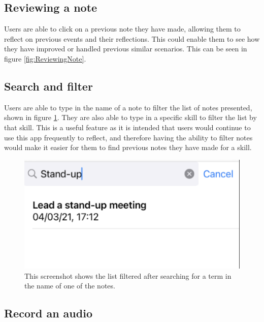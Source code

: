 \documentclass{l4proj}
\begin{document}
\subsection{Reviewing a note}

Users are able to click on a previous note they have made, allowing them to reflect on previous events and their reflections. This could enable them to see how they have improved or handled previous similar scenarios. This can be seen in figure \ref{fig:ReviewingNote}.

\subsection{Search and filter}

Users are able to type in the name of a note to filter the list of notes presented, shown in figure \ref{fig:SearchFilter}. They are also able to type in a specific skill to filter the list by that skill. This is a useful feature as it is intended that users would continue to use this app frequently to reflect, and therefore having the ability to filter notes would make it easier for them to find previous notes they have made for a skill. 

\begin{figure}
    \centering
    \includegraphics[scale=0.4]{images/SearchFilter.pdf}    
    \caption{This screenshot shows the list filtered after searching for a term in the name of one of the notes.}
    \label{fig:SearchFilter} 
\end{figure}

\subsection{Record an audio}
\end{document}
